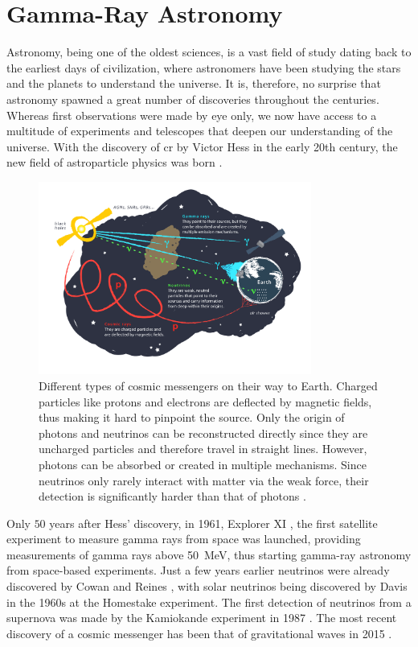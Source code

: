 \chapter{Gamma-Ray Astronomy}
\label{ch:gamma-ray-astronomy}

Astronomy, being one of the oldest sciences, is a vast field of study dating back to the earliest
days of civilization, where astronomers have been studying the stars and the planets to understand
the universe. It is, therefore, no surprise that astronomy spawned a great number of discoveries
throughout the centuries. Whereas first observations were made by eye only, we now have access to a multitude
of experiments and telescopes that deepen our understanding of the universe. With the discovery of
\gls{cr} by Victor Hess in the early 20th century, the new field of astroparticle physics was born \cite{longair1981}.

\begin{figure}
    \centering
    \includegraphics[width=0.8\textwidth]{graphics/figure5.png}
    \caption{Different types of cosmic messengers on their way to Earth. Charged particles like protons and electrons
    are deflected by magnetic fields, thus making it hard to pinpoint the source. Only the
    origin of photons and neutrinos can be reconstructed directly since they are uncharged particles
    and therefore travel in straight lines. However, photons can be absorbed or created in multiple
    mechanisms. Since neutrinos only rarely interact with matter via the weak force, their detection
    is significantly harder than that of photons \cite{fig5}.}
    \label{fig:fig5}
\end{figure}

Only \(\num{50}\) years after Hess' discovery, in 1961, Explorer XI \cite{explorer11}, the first satellite experiment
to measure gamma rays from space was launched, providing measurements of gamma rays above
\SI{50}{\mega\eV}, thus starting gamma-ray astronomy from space-based experiments. Just a few years
earlier neutrinos were already discovered by Cowan and Reines \cite{cowan1956}, with solar neutrinos being
discovered by Davis \etal{} \cite{davis} in the 1960s at the Homestake experiment.
The first detection of neutrinos from a supernova was made by the Kamiokande experiment in 1987
\cite{kamiokande1987}. The most recent discovery of a cosmic messenger has been that of gravitational
waves in 2015 \cite{grav_waves}.

